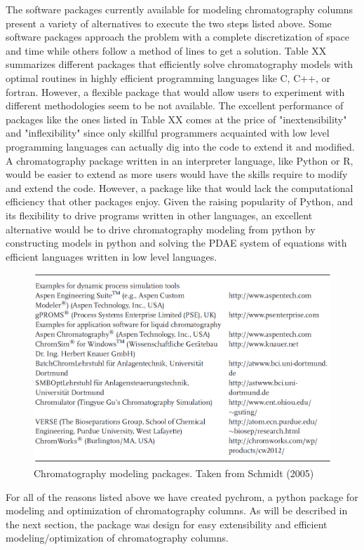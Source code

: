 \documentclass[paper=a4, fontsize=11pt]{scrartcl}
\begin{document}
The software packages currently available for modeling chromatography columns 
present a variety of alternatives to execute the two steps listed above. Some software packages approach the problem with a complete discretization of space and time while others follow a method of lines to get a solution. Table XX summarizes different packages that efficiently solve chromatography models with optimal routines in highly efficient programming languages like C, C++, or fortran. However, a flexible package that would allow users to experiment with different methodologies seem to be not available. The excellent performance of packages like the ones listed in Table XX comes at the price of "inextensibility" and "inflexibility" since only skillful programmers acquainted with low level programming languages can actually dig into the code to extend it and modified. A chromatography package written in an interpreter language, like Python or R, would be easier to extend as more users would have the skills require to modify and extend the code. However, a package like that would lack the computational efficiency that other packages enjoy. Given the raising popularity of Python, and its flexibility to drive programs written in other languages, an excellent alternative would be to drive chromatography modeling from python by constructing models in python and solving the PDAE system of equations with efficient languages written in low level languages. 
\begin{figure}[h]
\label{software}
\centering
\includegraphics[width=\textwidth]{software.png}
\caption{Chromatography modeling packages. Taken from Schmidt (2005)}
\end{figure}
For all of the reasons listed above we have created pychrom, a python package for modeling and optimization of chromatography columns. As will be described in the next section, the package was design for easy extensibility and efficient modeling/optimization of chromatography columns.
\end{document}
